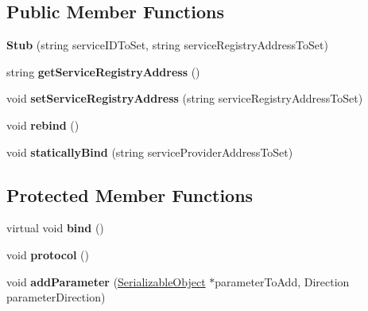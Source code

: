 \subsection*{Public Member Functions}
\begin{DoxyCompactItemize}
\item 
\hypertarget{class_stub_aa55ad8aa59df615119289ce19d44ba96}{
{\bfseries Stub} (string serviceIDToSet, string serviceRegistryAddressToSet)}
\label{class_stub_aa55ad8aa59df615119289ce19d44ba96}

\item 
\hypertarget{class_stub_a6fbc3f67d8f11cf1b656642dcef68397}{
string {\bfseries getServiceRegistryAddress} ()}
\label{class_stub_a6fbc3f67d8f11cf1b656642dcef68397}

\item 
\hypertarget{class_stub_a36f4a65967f263fa92322c0b4a972621}{
void {\bfseries setServiceRegistryAddress} (string serviceRegistryAddressToSet)}
\label{class_stub_a36f4a65967f263fa92322c0b4a972621}

\item 
\hypertarget{class_stub_af4becfbab3eaa0e486ab8293a51d505c}{
void {\bfseries rebind} ()}
\label{class_stub_af4becfbab3eaa0e486ab8293a51d505c}

\item 
\hypertarget{class_stub_aea5748e84f5918effce318909cd08379}{
void {\bfseries staticallyBind} (string serviceProviderAddressToSet)}
\label{class_stub_aea5748e84f5918effce318909cd08379}

\end{DoxyCompactItemize}
\subsection*{Protected Member Functions}
\begin{DoxyCompactItemize}
\item 
\hypertarget{class_stub_aa88973d8e2e253b2fa2c9e0e71a5149b}{
virtual void {\bfseries bind} ()}
\label{class_stub_aa88973d8e2e253b2fa2c9e0e71a5149b}

\item 
\hypertarget{class_stub_a0b760af7a22ec4ad5a347b7bc5544a1d}{
void {\bfseries protocol} ()}
\label{class_stub_a0b760af7a22ec4ad5a347b7bc5544a1d}

\item 
\hypertarget{class_stub_a976cc7ddd3742ee8b00867ccfb537926}{
void {\bfseries addParameter} (\hyperlink{class_serializable_object}{SerializableObject} $\ast$parameterToAdd, Direction parameterDirection)}
\label{class_stub_a976cc7ddd3742ee8b00867ccfb537926}

\end{DoxyCompactItemize}
